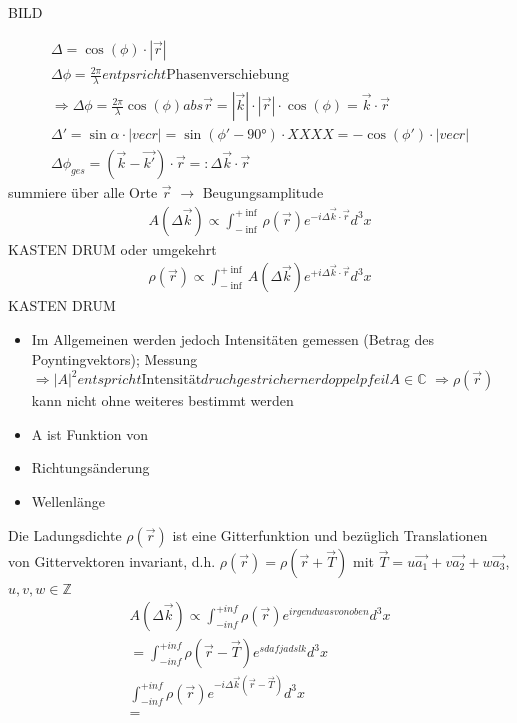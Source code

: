 \documentclass[paper=A4,12pt,pagesize,twoside,BCOR=8mm,ngerman]{scrartcl}
\newcommand{\abs}[1]{\left| #1 \right|} %
\begin{document}
		BILD
		
		\begin{align*}
			\Delta = \cos (\phi) \cdot \abs{\vec{r}} \\
			\Delta \phi = \frac{2\pi}{\lambda} entpsricht \text{Phasenverschiebung} \\
			\Rightarrow \Delta \phi = \frac{2\pi}{\lambda} \cos (\phi) abs{\vec{r}} = \abs{\vec{k}} \cdot \abs{\vec{r}} \cdot \cos (\phi) = \vec{k} \cdot \vec{r} \\
			\Delta ' = \sin \alpha \cdot \abs{vec{r}} = \sin (\phi ' - 90°) \cdot XXXX = -\cos (\phi ') \cdot \abs{vec{r}} \\
			\Delta \phi_{ges} = (\vec{k} - \vec{k'}) \cdot \vec{r} =: \Delta \vec{k} \cdot \vec{r}
		\end{align*}
		summiere über alle Orte $\vec{r}$ $\rightarrow$ Beugungsamplitude
		\begin{align*}
			A(\Delta\vec{k}) \propto \int_{-\inf}^{+\inf} \rho (\vec{r}) e^{-i\Delta\vec{k}\cdot\vec{r}} d^{3}x
		\end{align*}		
		KASTEN DRUM
		oder umgekehrt
		\begin{align*}
			\rho (\vec{r}) \propto \int_{-\inf}^{+\inf} A(\Delta\vec{k}) e^{+i\Delta\vec{k}\cdot\vec{r}} d^{3}x
		\end{align*}
		KASTEN DRUM
		\begin{itemize}
		\item Im Allgemeinen werden jedoch Intensitäten gemessen (Betrag des Poyntingvektors); Messung $\Rightarrow \abs{A}^{2} entspricht \text{Intensität} druchgestrichernerdoppelpfeil A \in \mathbb{C}$
		$\Rightarrow \rho (\vec{r})$ kann nicht ohne weiteres bestimmt werden\\
		\item A ist Funktion von 
		
			\item	Richtungsänderung
			\item	Wellenlänge
		\end{itemize}
		
		Die Ladungsdichte $\rho (\vec{r})$ ist eine Gitterfunktion und bezüglich Translationen von Gittervektoren invariant, d.h.
		$\rho (\vec{r}) = \rho (\vec{r}+\vec{T})$ mit $\vec{T} = u\vec{a_{1}} + v\vec{a_{2}} + w\vec{a_{3}}$, $u, v, w \in \mathbb{Z}$
		\begin{align*}
			A(\Delta\vec{k}) \propto \int_{-inf}^{+inf} \rho (\vec{r}) e^{irgendwasvonoben} d^{3}x\\
			=\int_{-inf}^{+inf} \rho (\vec{r}-\vec{T}) e^{sdafjadslk} d^{3}x \\
			\int_{-inf}^{+inf} \rho (\vec{r}) e^{-i\Delta\vec{k}(\vec{r}-\vec{T})} d^{3}x \\
			=
 		\end{align*}
		 
		
		
		
		
		
		
		
		
		
		
		
		
\end{document}

